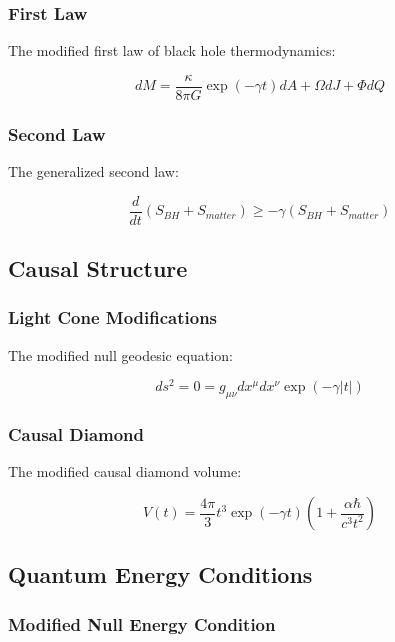 \documentclass[12pt]{article}
\theoremstyle{plain}
\theoremstyle{definition}
\theoremstyle{remark}
\begin{document}
\subsubsection{First Law}

The modified first law of black hole thermodynamics:

\begin{equation}
dM = \frac{\kappa}{8\pi G}\exp(-\gamma t)dA + \Omega dJ + \Phi dQ
\end{equation}

\subsubsection{Second Law}

The generalized second law:

\begin{equation}
\frac{d}{dt}(S_{BH} + S_{matter}) \geq -\gamma(S_{BH} + S_{matter})
\end{equation}

\subsection{Causal Structure}

\subsubsection{Light Cone Modifications}

The modified null geodesic equation:

\begin{equation}
ds^2 = 0 = g_{\mu\nu}dx^\mu dx^\nu\exp(-\gamma|t|)
\end{equation}

\subsubsection{Causal Diamond}

The modified causal diamond volume:

\begin{equation}
V(t) = \frac{4\pi}{3}t^3\exp(-\gamma t)\left(1 + \frac{\alpha\hbar}{c^3t^2}\right)
\end{equation}

\subsection{Quantum Energy Conditions}

\subsubsection{Modified Null Energy Condition}
\end{document}
